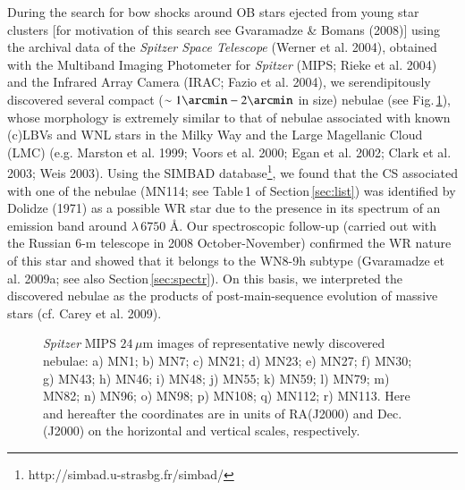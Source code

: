 \documentclass[useAMS]{mn2e}
\begin{document}
During the search for bow shocks around OB stars ejected from young
star clusters [for motivation of this search see Gvaramadze \&
Bomans (2008)] using the archival data of the {\it Spitzer Space
Telescope} (Werner et al. 2004), obtained with the Multiband Imaging
Photometer for {\it Spitzer} (MIPS; Rieke et al. 2004) and the
Infrared Array Camera (IRAC; Fazio et al. 2004), we serendipitously
discovered several compact ($\sim 1\arcmin -2\arcmin$ in size)
nebulae (see Fig.\,\ref{fig:new}), whose morphology is extremely
similar to that of nebulae associated with known (c)LBVs and WNL
stars in the Milky Way and the Large Magellanic Cloud (LMC) (e.g.
Marston et al. 1999; Voors et al. 2000; Egan et al. 2002; Clark et
al. 2003; Weis 2003). Using the SIMBAD
database\footnote{http://simbad.u-strasbg.fr/simbad/}, we found that
the CS associated with one of the nebulae (MN114; see Table\,1 of
Section\,\ref{sec:list}) was identified by Dolidze (1971) as a
possible WR star due to the presence in its spectrum of an emission
band around $\lambda \, 6750$ \AA. Our spectroscopic follow-up
(carried out with the Russian 6-m telescope in 2008
October-November) confirmed the WR nature of this star and showed
that it belongs to the WN8-9h subtype (Gvaramadze et al. 2009a; see
also Section\,\ref{sec:spectr}). On this basis, we interpreted the
discovered nebulae as the products of post-main-sequence evolution
of massive stars (cf. Carey et al. 2009).

%
\begin{figure}%
\caption{{\it Spitzer} MIPS $24 \, \mu$m images of representative
newly discovered nebulae: a) MN1; b) MN7; c) MN21; d) MN23; e) MN27;
f) MN30; g) MN43; h) MN46; i) MN48; j) MN55; k) MN59; l) MN79; m) MN82;
n) MN96; o) MN98; p) MN108; q) MN112; r) MN113. Here
and hereafter the coordinates are in units of RA(J2000) and Dec.(J2000)
on the horizontal and vertical scales, respectively.
}
\label{fig:new}
\end{figure}
%
\end{document}
